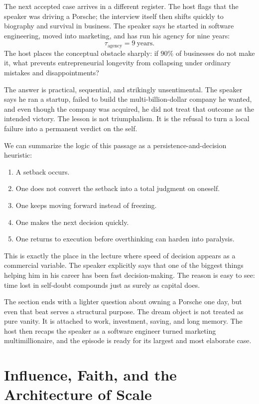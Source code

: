 The next accepted case arrives in a different register. The host flags that the speaker was driving a Porsche; the interview itself then shifts quickly to biography and survival in business. The speaker says he started in software engineering, moved into marketing, and has run his agency for nine years:
\begin{equation}
\tau_{\text{agency}} = 9\ \text{years}.
\end{equation}
The host places the conceptual obstacle sharply: if \(90\%\) of businesses do not make it, what prevents entrepreneurial longevity from collapsing under ordinary mistakes and disappointments?

The answer is practical, sequential, and strikingly unsentimental. The speaker says he ran a startup, failed to build the multi-billion-dollar company he wanted, and even though the company was acquired, he did not treat that outcome as the intended victory. The lesson is not triumphalism. It is the refusal to turn a local failure into a permanent verdict on the self.

We can summarize the logic of this passage as a persistence-and-decision heuristic:
\begin{enumerate}
\item A setback occurs.
\item One does not convert the setback into a total judgment on oneself.
\item One keeps moving forward instead of freezing.
\item One makes the next decision quickly.
\item One returns to execution before overthinking can harden into paralysis.
\end{enumerate}
This is exactly the place in the lecture where speed of decision appears as a commercial variable. The speaker explicitly says that one of the biggest things helping him in his career has been fast decision-making. The reason is easy to see: time lost in self-doubt compounds just as surely as capital does.

The section ends with a lighter question about owning a Porsche one day, but even that beat serves a structural purpose. The dream object is not treated as pure vanity. It is attached to work, investment, saving, and long memory. The host then recaps the speaker as a software engineer turned marketing multimillionaire, and the episode is ready for its largest and most elaborate case.

\section{Influence, Faith, and the Architecture of Scale}

